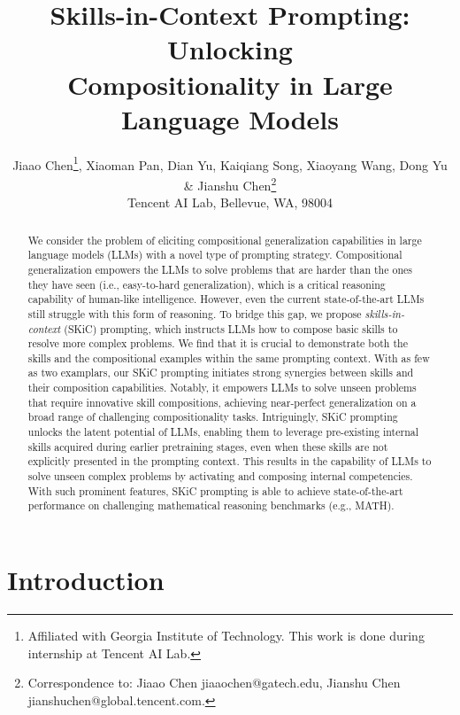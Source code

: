 \documentclass{article} \usepackage{arxiv}
\date{}
\title{Skills-in-Context Prompting:  Unlocking \\ Compositionality in Large Language Models}
\author{Jiaao Chen\thanks{Affiliated with Georgia Institute of Technology. This work is done during internship at Tencent AI Lab.}, \; Xiaoman Pan, Dian Yu, Kaiqiang Song, Xiaoyang Wang, Dong Yu \& Jianshu Chen\thanks{Correspondence to: Jiaao Chen jiaaochen@gatech.edu, Jianshu Chen jianshuchen@global.tencent.com.} \\
Tencent AI Lab, Bellevue, WA, 98004
}
\begin{document}
\maketitle


\begin{abstract}
We consider the problem of eliciting compositional generalization capabilities in large language models (LLMs) with a novel type of prompting strategy. Compositional generalization empowers the LLMs to solve problems that are harder than the ones they have seen (i.e., easy-to-hard generalization), which is a critical reasoning capability of human-like intelligence. However, even the current state-of-the-art LLMs still struggle with this form of reasoning. To bridge this gap, we propose \emph{skills-in-context} (SKiC) prompting, which instructs LLMs how to compose basic skills to resolve more complex problems. We find that it is crucial to demonstrate both the skills and the compositional examples within the same prompting context. With as few as two examplars, our SKiC prompting initiates strong synergies between skills and their composition capabilities. Notably, it empowers LLMs to solve unseen problems that require innovative skill compositions, achieving near-perfect generalization on a broad range of challenging compositionality tasks. Intriguingly, SKiC prompting unlocks the latent potential of LLMs, enabling them to leverage pre-existing internal skills acquired during earlier pretraining stages, even when these skills are not explicitly presented in the prompting context. This results in the capability of LLMs to solve unseen complex problems by activating and composing internal competencies. With such prominent features, SKiC prompting is able to achieve state-of-the-art performance on challenging mathematical reasoning benchmarks (e.g., MATH).
\end{abstract}

\section{Introduction}
\label{sec: introduction}
\end{document}
